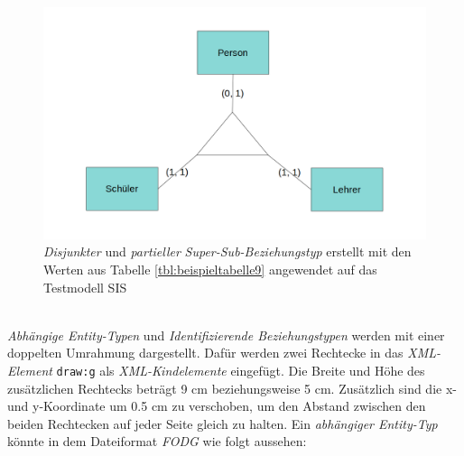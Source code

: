 \begin{figure}[H]
	\centering
	\includegraphics[width=12cm]{images/17.png}
	\caption{\textit{Disjunkter} und \textit{partieller} \textit{Super-Sub-Beziehungstyp} erstellt mit den Werten aus Tabelle \ref{tbl:beispieltabelle9} angewendet auf das Testmodell SIS}
	\label{ergebnis9}
\end{figure}
\noindent
\hon{}
\\
\noindent
\textit{Abhängige Entity-Typen} und \textit{Identifizierende Beziehungstypen} werden mit einer doppelten Umrahmung dargestellt. Dafür werden zwei Rechtecke in das \textit{XML-Element} \verb|draw:g| als \textit{XML-Kindelemente} eingefügt. Die Breite und Höhe des zusätzlichen Rechtecks beträgt 9 cm beziehungsweise 5 cm. Zusätzlich sind die x- und y-Koordinate um 0.5 cm zu verschoben, um den Abstand zwischen den beiden Rechtecken auf jeder Seite gleich zu halten. Ein \textit{abhängiger Entity-Typ} könnte in dem Dateiformat \textit{FODG} wie folgt aussehen:

